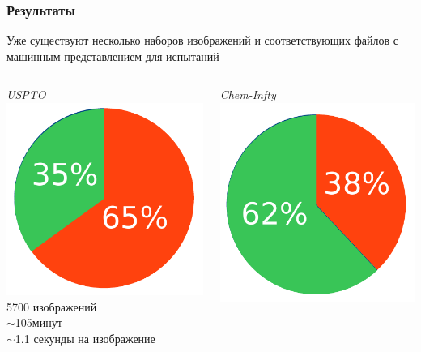 \begin{frame}
  \frametitle{Результаты}
  Уже существуют несколько наборов изображений и соответствующих файлов с машинным представлением для испытаний

  \begin{columns}
    \begin{column}{0.5\textwidth}
      \begin{center}\emph{USPTO \footnotemark} \\ \includegraphics[scale=0.45]{media/pie_chart2.pdf} \\ 5700 изображений \\
      $\sim$105минут \\ $\sim$1.1 секунды на изображение \end{center}
    \end{column}
    \begin{column}{0.5\textwidth}
      \begin{center}\emph{Chem-Infty} \\ \includegraphics[scale=0.4]{media/pie_chart1.pdf} \\ 

\end{center}
\end{column}
\end{columns}
\end{frame}
